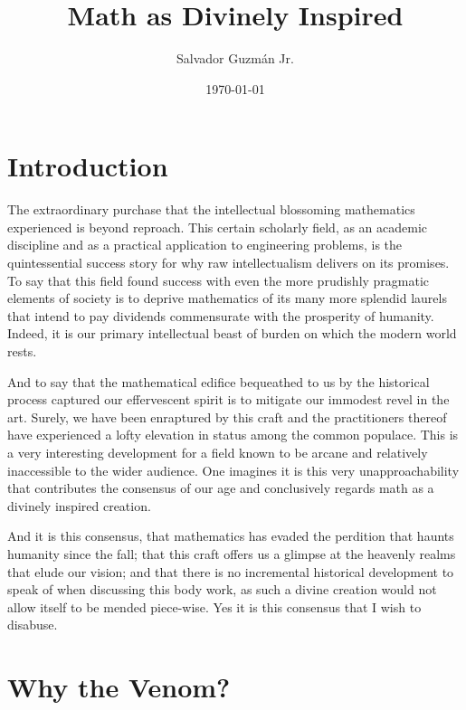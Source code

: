 \documentclass[ms,a4paper]{memoir}
\begin{document}
	\title{\textbf{Math as Divinely Inspired}}
	
	\author{Salvador Guzm\'{a}n Jr.}
	\date{\today}
	\maketitle
	
	\pagebreak
	
	\pagebreak
	\tableofcontents
	\pagebreak
	
	\chapter{Introduction}
	The extraordinary purchase that the intellectual blossoming mathematics experienced is beyond reproach. This certain scholarly field, as an academic discipline and as a practical application to engineering problems, is the quintessential success story for why raw intellectualism delivers on its promises. To say that this field found success with even the more prudishly pragmatic elements of society is to deprive mathematics of its many more splendid laurels that intend to pay dividends commensurate with the prosperity of humanity. Indeed, it is our primary intellectual beast of burden on which the modern world rests.
	
	And to say that the mathematical edifice bequeathed to us by the historical process captured our effervescent spirit is to mitigate our immodest revel in the art. Surely, we have been enraptured by this craft and the practitioners thereof have experienced a lofty elevation in status among the common populace. This is a very interesting development for a field known to be arcane and relatively inaccessible to the wider audience. One imagines it is this very unapproachability that contributes the consensus of our age and conclusively regards math as a divinely inspired creation.
	
	And it is this consensus, that mathematics has evaded the perdition that haunts humanity since the fall; that this craft offers us a glimpse at the heavenly realms that elude our vision; and that there is no incremental historical development to speak of when discussing this body work, as such a divine creation would not allow itself to be mended piece-wise. Yes it is this consensus that I wish to disabuse.
	
	\chapter{Why the Venom?}
\end{document}
